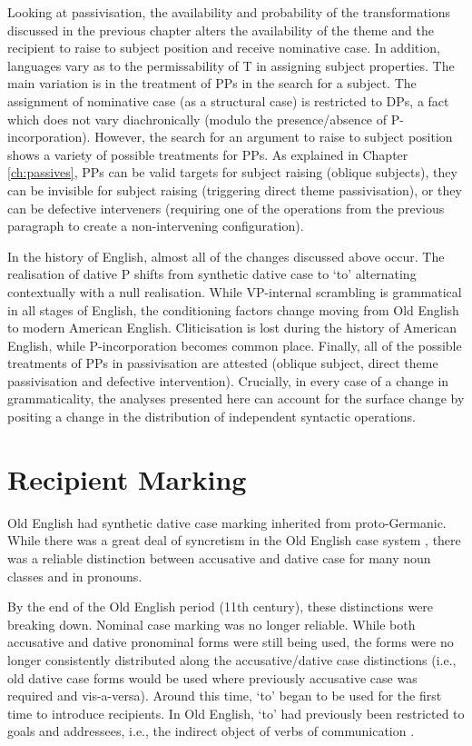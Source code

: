	Looking at passivisation, the availability and probability of the transformations discussed in the previous chapter alters the availability of the theme and the recipient to raise to subject position and receive nominative case. In addition, languages vary as to the permissability of T in assigning subject properties. The main variation is in the treatment of PPs in the search for a subject. The assignment of nominative case (as a structural case) is restricted to DPs, a fact which does not vary diachronically (modulo the presence/absence of P-incorporation). However, the search for an argument to raise to subject position shows a variety of possible treatments for PPs. As explained in Chapter \ref{ch:passives}, PPs can be valid targets for subject raising (oblique subjects), they can be invisible for subject raising (triggering direct theme passivisation), or they can be defective interveners (requiring one of the operations from the previous paragraph to create a non-intervening configuration).

	In the history of English, almost all of the changes discussed above occur. The realisation of dative P shifts from synthetic dative case to `to' alternating contextually with a null realisation. While VP-internal scrambling is grammatical in all stages of English, the conditioning factors change moving from Old English to modern American English. Cliticisation is lost during the history of American English, while P-incorporation becomes common place. Finally, all of the possible treatments of PPs in passivisation are attested (oblique subject, direct theme passivisation and defective intervention). Crucially, in every case of a change in grammaticality, the analyses presented here can account for the surface change by positing a change in the distribution of independent syntactic operations.

\section{Recipient Marking}
	Old English had synthetic dative case marking inherited from proto-Germanic. While there was a great deal of syncretism in the Old English case system \citep{Allen.1999}, there was a reliable distinction between accusative and dative case for many noun classes and in pronouns.

	By the end of the Old English period (11th century), these distinctions were breaking down. Nominal case marking was no longer reliable. While both accusative and dative pronominal forms were still being used, the forms were no longer consistently distributed along the accusative/dative case distinctions (i.e., old dative case forms would be used where previously accusative case was required and vis-a-versa). Around this time, `to' began to be used for the first time to introduce recipients. In Old English, `to' had previously been restricted to goals and addressees, i.e., the indirect object of verbs of communication \citep{Allen.1999,McFadden.2002,OED.2013}. 

